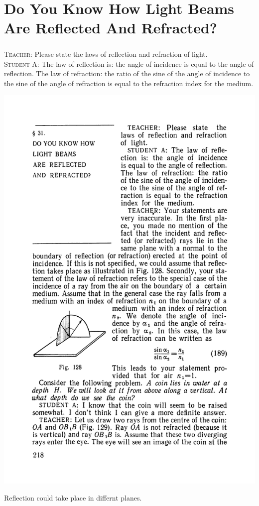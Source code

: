 \documentclass[a4paper,sfsidenotes]{tufte-book}
\begin{document}
\chapter{Do You Know How Light Beams Are Reflected And Refracted?}
\label{ch-31}
\paragraph{}
\textsc{Teacher:} Please state the laws of reflection and refraction of light.
\\
\textsc{Student A:} The law of reflection is: the angle of incidence is equal to the angle of reflection. The law of refraction: the ratio of the sine of the angle of incidence to the sine of the angle of refraction is equal to the refraction index for the medium.
\begin{marginfigure}%
\centering
\includegraphics[width=.9\linewidth]{fig-128a}
\caption{ Reflection could take place in differnt planes.}
\label{fig-128}
\end{marginfigure}
\end{document}
